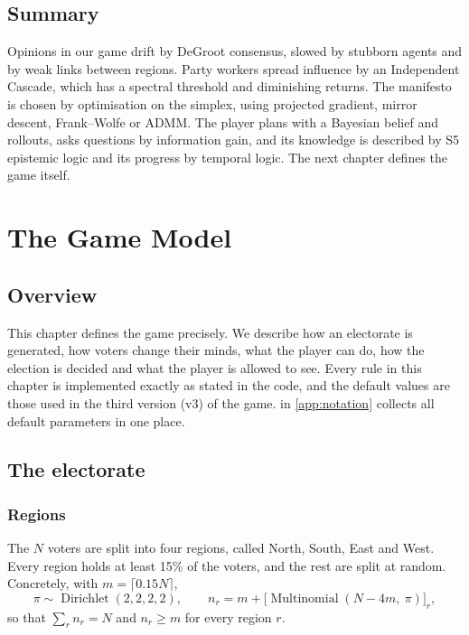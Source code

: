 \documentclass[11pt,a4paper,oneside]{report}
\newcommand{\overviewsection}{\section{Overview}}
\newcommand{\summarysection}{\section{Summary}}
\begin{document}
\summarysection

Opinions in our game drift by DeGroot consensus, slowed by stubborn agents and by weak links between
regions. Party workers spread influence by an Independent Cascade, which has a spectral threshold and
diminishing returns. The manifesto is chosen by optimisation on the simplex, using projected gradient,
mirror descent, Frank--Wolfe or ADMM. The player plans with a Bayesian belief and rollouts, asks questions
by information gain, and its knowledge is described by S5 epistemic logic and its progress by temporal
logic. The next chapter defines the game itself.

\chapter{The Game Model}\label{ch:model}

\overviewsection

This chapter defines the game precisely. We describe how an electorate is generated, how voters change
their minds, what the player can do, how the election is decided and what the player is allowed to see.
Every rule in this chapter is implemented exactly as stated in the code, and the default values are those
used in the third version (v3) of the game.  in \cref{app:notation} collects all default
parameters in one place.

\section{The electorate}

\subsection{Regions}

The $N$ voters are split into four regions, called North, South, East and West. Every region holds at
least 15\% of the voters, and the rest are split at random. Concretely, with $m=\lceil 0.15N\rceil$,
\begin{equation}
  \pi \sim \operatorname{Dirichlet}(2,2,2,2), \qquad
  n_r = m + \bigl[\operatorname{Multinomial}(N-4m,\ \pi)\bigr]_r ,
\end{equation}
so that $\sum_r n_r = N$ and $n_r \ge m$ for every region $r$.
\end{document}
